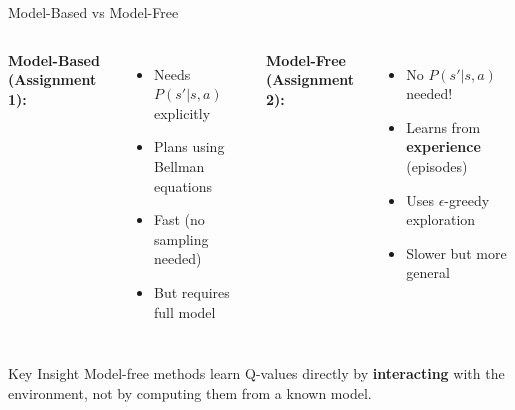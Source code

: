 \documentclass[aspectratio=169]{beamer}
\begin{document}
\begin{frame}{Model-Based vs Model-Free}
    \begin{columns}
        \textbf{Model-Based (Assignment 1):}
        \begin{itemize}
            \item Needs $P(s'|s,a)$ explicitly
            \item Plans using Bellman equations
            \item Fast (no sampling needed)
            \item But requires full model
        \end{itemize}

        \textbf{Model-Free (Assignment 2):}
        \begin{itemize}
            \item No $P(s'|s,a)$ needed!
            \item Learns from \textbf{experience} (episodes)
            \item Uses $\epsilon$-greedy exploration
            \item Slower but more general
        \end{itemize}
    \end{columns}

    \vspace{0.5cm}

    \begin{block}{Key Insight}
        Model-free methods learn Q-values directly by \textbf{interacting} with the environment, not by computing them from a known model.
    \end{block}
\end{frame}
\end{document}
